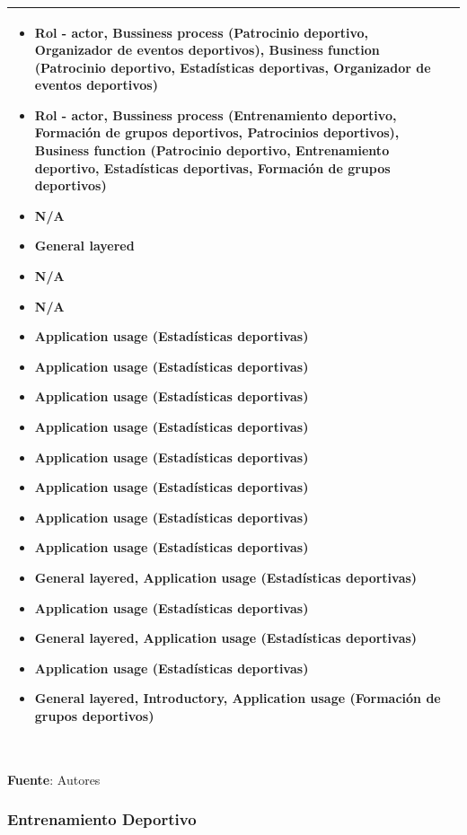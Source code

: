 \begin{table}[!htb]
\begin{center}
{\begin{tabular}{|p{7cm}|p{4cm}|}
\begin{itemize}
				\item Rol - actor, Bussiness process (Patrocinio deportivo, Organizador de eventos deportivos), Business function (Patrocinio deportivo, Estadísticas deportivas, Organizador de eventos deportivos)
				\item Rol - actor, Bussiness process (Entrenamiento deportivo, Formación de grupos deportivos, Patrocinios deportivos), Business function (Patrocinio deportivo, Entrenamiento deportivo, Estadísticas deportivas, Formación de grupos deportivos)
				\item N/A
				\item General layered
				\item N/A
				\item N/A
				\item Application usage (Estadísticas deportivas)
				\item Application usage (Estadísticas deportivas)
				\item Application usage (Estadísticas deportivas)
				\item Application usage (Estadísticas deportivas)
				\item Application usage (Estadísticas deportivas)
				\item Application usage (Estadísticas deportivas)
				\item Application usage (Estadísticas deportivas)
				\item Application usage (Estadísticas deportivas)
				\item General layered, Application usage (Estadísticas deportivas) 
				\item Application usage (Estadísticas deportivas) 
				\item General layered, Application usage (Estadísticas deportivas)
				\item Application usage (Estadísticas deportivas)
				\item General layered, Introductory, Application usage (Formación de grupos deportivos)
			\end{itemize} 
			\\
			\hline
		\end{tabular}
		} \\
		\textbf{Fuente}: Autores
	\end{center}
\end{table}

\subsubsection{Entrenamiento Deportivo}

